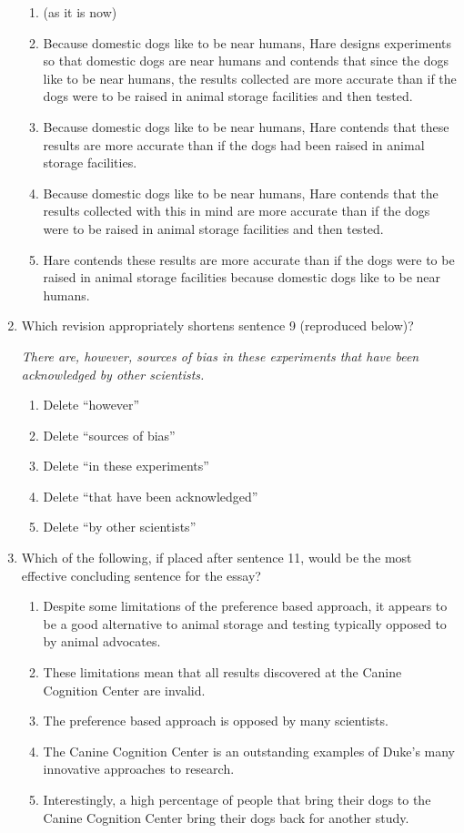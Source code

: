 \begin{enumerate}
\begin{enumerate}[label=(\Alph*)]
\item (as it is now)
\item Because domestic dogs like to be near humans, Hare designs experiments so that domestic dogs are near humans and contends that since the dogs like to be near humans, the results collected are more accurate than if the dogs were to be raised in animal storage facilities and then tested.
\item  Because domestic dogs like to be near humans, Hare contends that these results are more accurate than if the dogs had been raised in animal storage facilities. 
\item Because domestic dogs like to be near humans, Hare contends that the results collected with this in mind are more accurate than if the dogs were to be raised in animal storage facilities and then tested.
\item Hare contends these results are more accurate than if the dogs were to be raised in animal storage facilities because domestic dogs like to be near humans.
\end{enumerate}

\item Which revision appropriately shortens sentence 9 (reproduced below)?

\textit{There are, however, sources of bias in these experiments that have been acknowledged by other scientists.}

\begin{enumerate}[label=(\Alph*)]
\item Delete ``however''
\item Delete ``sources of bias''
\item Delete ``in these experiments''
\item Delete  ``that have been acknowledged''
\item Delete ``by other scientists''
\end{enumerate}

\item Which of the following, if placed after sentence 11, would be the most effective concluding sentence for the essay?

\begin{enumerate}[label=(\Alph*)]
\item  Despite some limitations of the preference based approach, it appears to be a good alternative to animal storage and testing typically opposed to by animal advocates. 
\item These limitations mean that all results discovered at the Canine Cognition Center are invalid. 
\item The preference based approach is opposed by many scientists.
\item The Canine Cognition Center is an outstanding examples of Duke's many innovative approaches to research. 
\item Interestingly, a high percentage of people that bring their dogs to the Canine Cognition Center bring their dogs back for another study. 
\end{enumerate}
\end{enumerate} 

